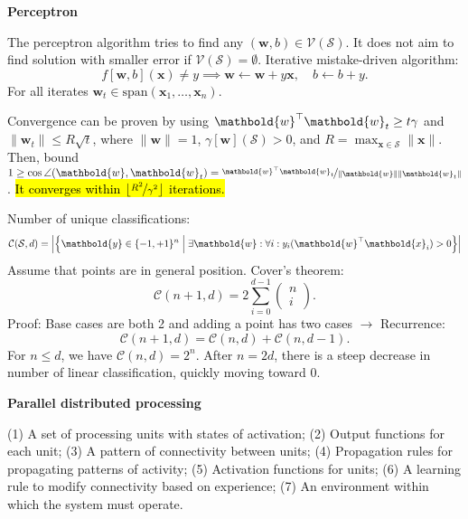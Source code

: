 \documentclass[10pt]{article}
\newenvironment{topic}[1]
{\textbf{\sffamily \footnotesize \colorbox{black}{\rlap{\textbf{\textcolor{white}{#1}}}\hspace{\linewidth}\hspace{-2\fboxsep}}}}
{}
\newenvironment{subtopic}[1]
{\begin{center}\textbf{\footnotesize \sffamily #1}\end{center}}
{}
\renewcommand{\vec}[1]{\ensuremath{\mathbold{#1}}}
\begin{document}
\begin{multicols*}{3}
\begin{topic}{Connectionism}
\begin{subtopic}{Perceptron}
            The perceptron algorithm tries to find any $(\vec{w},b) \in \mathcal{V}(\mathcal{S})$. It does not
            aim to find solution with smaller error if $\mathcal{V}(\mathcal{S}) = \emptyset$. Iterative
            mistake-driven algorithm: \[
                f[\vec{w},b](\vec{x}) \neq y \implies \vec{w} \gets \vec{w} + y \vec{x}, \quad b \gets b + y.
            \]
            For all iterates $\vec{w}_t \in \mathrm{span}(\vec{x}_1, \ldots, \vec{x}_n)$.

            Convergence can be proven by using $\transpose{\vec{w}} \vec{w}_t \geq t \gamma$ and $\| \vec{w}_t
                \| \leq R \sqrt{t}$, where $\| \vec{w} \| = 1$, $\gamma[\vec{w}](\mathcal{S}) > 0$, and $R =
                \max_{\vec{x} \in \mathcal{S}} \| \vec{x} \|$. Then, bound $1 \geq \cos\angle{(\vec{w},\vec{w}_t)}
                = \nicefrac{\transpose{\vec{w}} \vec{w}_t}{\| \vec{w} \| \| \vec{w}_t \|}$. \hl{It converges within
                $\lfloor \nicefrac{R^2}{\gamma^2} \rfloor$ iterations.}

            Number of unique classifications: \[
                \mathcal{C}(\mathcal{S},d) = \lft| \lft\{ \vec{y} \in \{ -1,+1 \}^n \;\middle|\; \exists \vec{w} : \forall i : y_i (\transpose{\vec{w}}\vec{x}_i) > 0 \rgt\} \rgt|
            \]
            Assume that points are in general position. Cover's theorem: \[
                \mathcal{C}(n+1,d) = 2 \sum_{i=0}^{d-1} \begin{pmatrix} n \\ i \end{pmatrix}.
            \]
            Proof: Base cases are both 2 and adding a point has two cases $\to$ Recurrence: \[
                \mathcal{C}(n+1,d) = \mathcal{C}(n,d) + \mathcal{C}(n,d-1).
            \]
            For $n \leq d$, we have $\mathcal{C}(n,d) = 2^n$. After $n=2d$, there is a steep decrease in number
            of linear classification, quickly moving toward $0$.
        \end{subtopic}

        \begin{subtopic}{Parallel distributed processing}
            (1) A set of processing units with states of activation; (2) Output functions for each
            unit; (3) A pattern of connectivity between units; (4) Propagation rules for propagating
            patterns of activity; (5) Activation functions for units; (6) A learning rule to modify
            connectivity based on experience; (7) An environment within which the system must operate.
        \end{subtopic}


\end{topic}
\end{multicols*}
\end{document}
